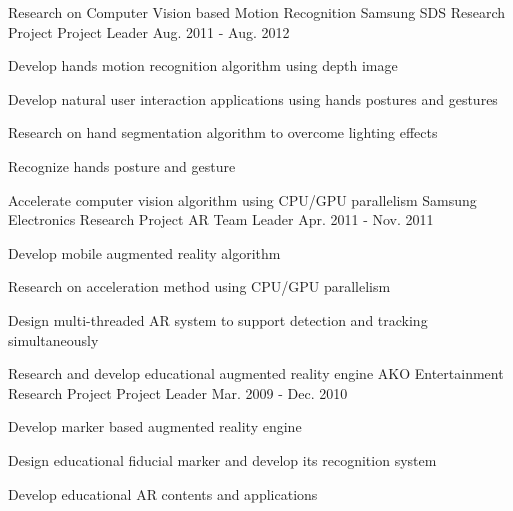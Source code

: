 \begin{cventries}
  \cventry
    {Research on Computer Vision based Motion Recognition} %
    {Samsung SDS Research Project} %
    {Project Leader} %
    {Aug. 2011 - Aug. 2012} %
    {
      \begin{cvitems} %
        \item {Develop hands motion recognition algorithm using depth image}
        \item {Develop natural user interaction applications using hands postures and gestures}
        \item {Research on hand segmentation algorithm to overcome lighting effects}
        \item {Recognize hands posture and gesture}
      \end{cvitems}
    }

  \cventry
    {Accelerate computer vision algorithm  using CPU/GPU parallelism} %
    {Samsung Electronics Research Project} %
    {AR Team Leader} %
    {Apr. 2011 - Nov. 2011} %
    {
      \begin{cvitems} %
        \item {Develop mobile augmented reality algorithm}
        \item {Research on acceleration method using CPU/GPU parallelism}
        \item {Design multi-threaded AR system to support detection and tracking simultaneously}
      \end{cvitems}
    }

  \cventry
    {Research and develop educational augmented reality engine} %
    {AKO Entertainment Research Project} %
    {Project Leader} %
    {Mar. 2009 - Dec. 2010} %
    {
      \begin{cvitems} %
        \item {Develop marker based augmented reality engine}
        \item {Design educational fiducial marker and develop its recognition system}
        \item {Develop educational AR contents and applications}
      \end{cvitems}
    }


\end{cventries}
